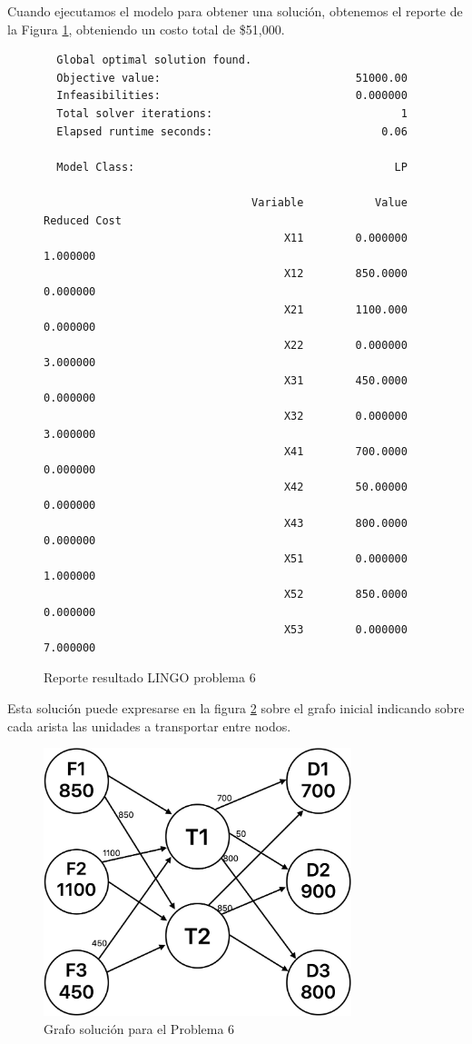 \documentclass[12pt]{article}  %
\begin{document}
Cuando ejecutamos el modelo para obtener una solución, obtenemos el reporte de la Figura \ref{fig:reporteProb6}, obteniendo un costo total de \$51,000.

\begin{figure}[H]
	\centering
	\caption{Reporte resultado LINGO problema 6}
	\label{fig:reporteProb6}
	\begin{verbatim}
  Global optimal solution found.
  Objective value:                              51000.00
  Infeasibilities:                              0.000000
  Total solver iterations:                             1
  Elapsed runtime seconds:                          0.06

  Model Class:                                        LP

                                Variable           Value        Reduced Cost
                                     X11        0.000000            1.000000
                                     X12        850.0000            0.000000
                                     X21        1100.000            0.000000
                                     X22        0.000000            3.000000
                                     X31        450.0000            0.000000
                                     X32        0.000000            3.000000
                                     X41        700.0000            0.000000
                                     X42        50.00000            0.000000
                                     X43        800.0000            0.000000
                                     X51        0.000000            1.000000
                                     X52        850.0000            0.000000
                                     X53        0.000000            7.000000
	\end{verbatim}
\end{figure}

Esta solución puede expresarse en la figura \ref{fig:resProb6} sobre el grafo inicial indicando sobre cada arista las unidades a transportar entre nodos.

\begin{figure}[h]
    \centering
    \caption{Grafo solución para el Problema 6}
    \label{fig:resProb6}
    \includegraphics[width=0.8\textwidth]{assets/GrafoSolProb6.png}
\end{figure}
\end{document}
